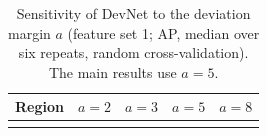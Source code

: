 \documentclass[pdflatex,sn-apa]{sn-jnl}
\begin{document}
\begin{appendices}
\begin{table}[!h]
\caption{Sensitivity of DevNet to the deviation margin $a$ (feature set 1; AP, median over six repeats, random cross-validation). The main results use $a = 5$.}\label{tab:margin}
\footnotesize
\begin{tabular*}{0.7\textwidth}{@{\extracolsep\fill}lcccc}
\toprule
Region & $a = 2$ & $a = 3$ & $a = 5$ & $a = 8$ \\
\midrule
\botrule
\end{tabular*}
\end{table}

\end{appendices}

\clearpage


\end{document}
